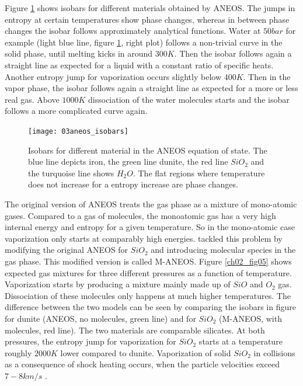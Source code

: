 Figure \ref{ch02_fig03} shows isobars for different materials obtained by ANEOS. The jumps in entropy at certain temperatures show phase changes, whereas in between phase changes the isobar follows approximately analytical functions. Water at $50bar$ for example (light blue line, figure \ref{ch02_fig03}, right plot) follows a non-trivial curve in the solid phase, until melting kicks in around $300K$. Then the isobar follows again a straight line as expected for a liquid with a constant ratio of specific heats. Another entropy jump for vaporization occurs slightly below $400K$. Then in the vapor phase, the isobar follows again a straight line as expected for a more or less real gas. Above $1000K$ dissociation of the water molecules starts and the isobar follows a more complicated curve again.

\begin{figure}
\begin{center}
\texttt{[image: 03aneos\_isobars]}
\caption{Isobars for different material in the ANEOS equation of state. The blue line depicts iron, the green line dunite, the red line $SiO_2$ and the turquoise line shows $H_2 O$. The flat regions where temperature does not increase for a entropy increase are phase changes. }
\label{ch02_fig03}
\end{center}
\end{figure}

The original version of ANEOS treats the gas phase as a mixture of mono-atomic gases. Compared to a gas of molecules, the monoatomic gas has a very high internal energy and entropy for a given temperature. So in the mono-atomic case vaporization only starts at comparably high energies. \cite{Melosh:2007p3502} tackled this problem by modifying the original ANEOS for $SiO_2$ and introducing molecular species in the gas phase. This modified version is called M-ANEOS. Figure \ref{ch02_fig05} shows expected gas mixtures for three different pressures as a function of temperature. Vaporization starts by producing a mixture mainly made up of $SiO$ and $O_2$ gas. Dissociation of these molecules only happens at much higher temperatures. The difference between the two models can be seen by comparing the isobars in figure for dunite (ANEOS, no molecules, green line) and for $SiO_2$ (M-ANEOS, with molecules, red line). The two materials are comparable silicates. At both pressures, the entropy jump for vaporization for $SiO_2$ starts at a temperature roughly $2000K$ lower compared to dunite. Vaporization of solid $SiO_2$ in collisions as a consequence of shock heating occurs, when the particle velocities exceed $7-8km/s$ \citep{Melosh:2007p3502}.


